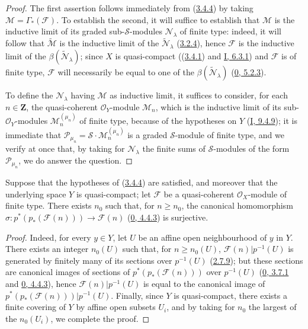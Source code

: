 \begin{proof}
The first assertion follows immediately from
(\hyperref[II.3.4.4]{3.4.4}) by taking
$\mathcal{M}=\Gamma_*(\mathcal{F})$. To establish the second, it will suffice
to establish that $\mathcal{M}$ is the inductive limit of its graded
sub-$\mathcal{S}$-modules $\mathcal{N}_\lambda$ of finite type: indeed, it
will follow that $\widetilde{\mathcal{M}}$ is the inductive limit of the
$\widetilde{\mathcal{N}}_\lambda$
(\hyperref[II.3.2.4]{3.2.4}), hence $\mathcal{F}$ is the inductive limit of
the $\beta(\widetilde{\mathcal{N}}_\lambda)$; since $X$ is quasi-compact
((\hyperref[II.3.4.1]{3.4.1}) and
\hyperref[I.6.3.1]{I, 6.3.1}) and $\mathcal{F}$ is of finite type,
$\mathcal{F}$ will necessarily be equal to one of the
$\beta(\widetilde{\mathcal{N}}_\lambda)$
(\hyperref[0.5.2.3]{0, 5.2.3}).

To define the $\mathcal{N}_\lambda$ having $\mathcal{M}$ as inductive limit,
it suffices to consider, for each $n\in\mathbf{Z}$, the quasi-coherent
$\mathcal{O}_Y$-module $\mathcal{M}_n$, which is the inductive limit of its
sub-$\mathcal{O}_Y$-modules $\mathcal{M}_n^{(\mu_n)}$ of finite type, because
of the hypotheses on $Y$
(\hyperref[I.9.4.9]{I, 9.4.9}); it is immediate that
$\mathcal{P}_{\mu_n}=\mathcal{S}\cdot\mathcal{M}_n^{(\mu_n)}$ is a
graded $\mathcal{S}$-module of finite type, and we verify at once that, by
taking for $\mathcal{N}_\lambda$ the finite sums of $\mathcal{S}$-modules of
the form $\mathcal{P}_{\mu_n}$, we do answer the question.
\end{proof}

\begin{corollary}[3.4.6]
\label{II.3.4.6}
Suppose that the hypotheses of (\hyperref[II.3.4.4]{3.4.4}) are
satisfied, and moreover that the underlying space $Y$ is quasi-compact; let
$\mathcal{F}$ be a quasi-coherent $\mathcal{O}_X$-module of finite type. There
exists $n_0$ such that, for $n\geq n_0$, the canonical homomorphism
$\sigma:p^*(p_*(\mathcal{F}(n)))\to\mathcal{F}(n)$
(\hyperref[0.4.4.3]{0, 4.4.3}) is surjective.
\end{corollary}

\begin{proof}
Indeed, for every $y\in Y$, let $U$ be an affine open neighbourhood of $y$ in
$Y$. There exists an integer $n_0(U)$ such that, for $n\geq n_0(U)$,
$\mathcal{F}(n)|p^{-1}(U)$ is generated by finitely many of its sections
over $p^{-1}(U)$ (\hyperref[II.2.7.9]{2.7.9}); but these sections
are canonical images of sections of $p^*(p_*(\mathcal{F}(n)))$ over
$p^{-1}(U)$ (\hyperref[0.3.7.1]{0, 3.7.1} and
\hyperref[0.4.4.3]{0, 4.4.3}), hence
$\mathcal{F}(n)|p^{-1}(U)$ is equal to the canonical image of
$p^*(p_*(\mathcal{F}(n)))|p^{-1}(U)$. Finally, since $Y$ is quasi-compact,
there exists a finite covering of $Y$ by affine open subsets $U_i$, and by
taking for $n_0$ the largest of the $n_0(U_i)$, we complete the proof.
\end{proof}

